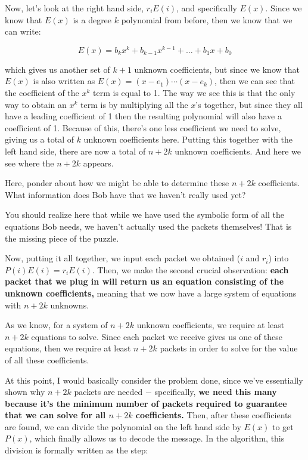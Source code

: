 \documentclass[10pt]{article}
\begin{document}
    Now, let's look at the right hand side, $r_iE(i)$, and specifically $E(x)$. Since we know that $E(x)$ is a degree $k$ polynomial from before, then we know that we can write: 

    \[ E(x) = b_kx^k + b_{k-1}x^{k-1} + \dots + b_1x + b_0\] 

    which gives us another set of $k+1$ unknown coefficients, but since we know that $E(x)$ is also written as $E(x) = (x-e_1)\cdots (x-e_k)$, then we can see that the coefficient of the $x^k$ term is equal to 1. The way we see this is that the only way to obtain an $x^k$ term is by multiplying all the $x$'s together, but since they all have a leading coefficient of 1 then the resulting polynomial will also have a coefficient of 1. Because of this, there's one less coefficient we need to solve, giving us a total of $k$ unknown coefficients here. Putting this together with the left hand side, there are now a total of $n+2k$ unknown coefficients. And here we see where the $n+2k$ appears.

    \begin{guidance*}{}{}
        Here, ponder about how we might be able to determine these $n+2k$ coefficients. What information does Bob have that we haven't really used yet? 

        You should realize here that while we have used the symbolic form of all the equations Bob needs, we haven't actually used the packets themselves! That is the missing piece of the puzzle. 
    \end{guidance*}

    Now, putting it all together, we input each packet we obtained ($i$ and $r_i$) into $P(i)E(i) = r_iE(i)$. Then, we make the second crucial observation: \textbf{each packet that we plug in will return us an equation consisting of the unknown coefficients,} meaning that we now have a large system of equations with $n+2k$ unknowns. 

    As we know, for a system of $n+2k$ unknown coefficients, we require at least $n+2k$ equations to solve. Since each packet we receive gives us one of these equations, then we require at least $n+2k$ packets in order to solve for the value of all these coefficients.

    At this point, I would basically consider the problem done, since we've essentially shown why $n+2k$ packets are needed $-$ specifically, \textbf{we need this many because it's the minimum number of packets required to guarantee that we can solve for all $n+2k$ coefficients.} Then, after these coefficients are found, we can divide the polynomial on the left hand side by $E(x)$ to get $P(x)$, which finally allows us to decode the message. In the algorithm, this division is formally written as the step: 
\end{document}
